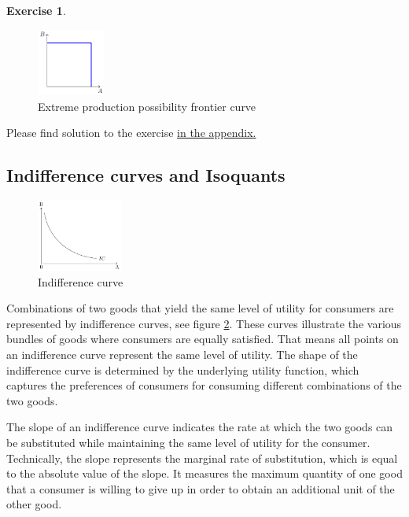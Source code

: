 \documentclass[
  12pt,
  oneside]{book}
\theoremstyle{definition}
\theoremstyle{definition}
\theoremstyle{definition}
\newtheorem{exercise}{Exercise}[chapter]
\theoremstyle{definition}
\theoremstyle{remark}
\begin{document}
\begin{exercise}
\begin{figure}
\centering
\includegraphics[width=0.2\textwidth,height=\textheight]{fig/ppf3.png}
\caption{\label{fig:ppf3} Extreme production possibility frontier curve}
\end{figure}

Please find solution to the exercise \protect\hyperlink{sol:Uproduction}{in the appendix.}

\hypertarget{indifference-curves-and-isoquants}{%
\subsection{Indifference curves and Isoquants}\label{indifference-curves-and-isoquants}}

\begin{figure}
\centering
\includegraphics[width=0.25\textwidth,height=\textheight]{fig/ic1.png}
\caption{\label{fig:ic1} Indifference curve}
\end{figure}

Combinations of two goods that yield the same level of utility for consumers are represented by indifference curves, see figure \ref{fig:ic1}. These curves illustrate the various bundles of goods where consumers are equally satisfied. That means all points on an indifference curve represent the same level of utility. The shape of the indifference curve is determined by the underlying utility function, which captures the preferences of consumers for consuming different combinations of the two goods.

The slope of an indifference curve indicates the rate at which the two goods can be substituted while maintaining the same level of utility for the consumer. Technically, the slope represents the marginal rate of substitution, which is equal to the absolute value of the slope. It measures the maximum quantity of one good that a consumer is willing to give up in order to obtain an additional unit of the other good.


\end{exercise}
\end{document}
